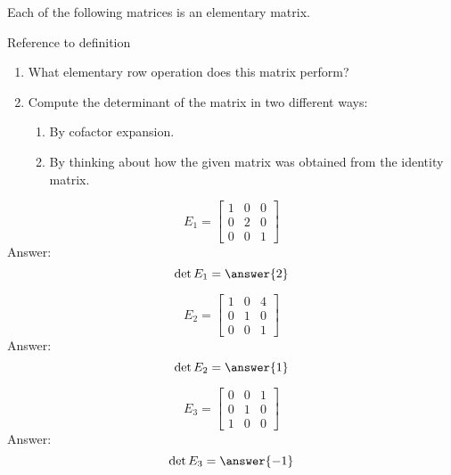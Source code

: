 \documentclass{ximera}
\begin{document}
\begin{problem}
Each of the following matrices is an elementary matrix. 
\begin{hint}
{\color{red}Reference to definition}
\end{hint}
  \begin{enumerate}
  \item What elementary row operation does this matrix perform?
  \item Compute the determinant of the matrix in two different ways:
    \begin{enumerate}
    \item By cofactor expansion.
    \item By thinking about how the given matrix was obtained from the identity matrix.
    \end{enumerate}
  \end{enumerate}
  
  \begin{problem}
  $$E_1=\begin{bmatrix}1&0&0\\0&2&0\\0&0&1\end{bmatrix}$$
   Answer: $$\det{E_1}=\answer{2}$$
  \end{problem}
  
  \begin{problem}
  $$E_2=\begin{bmatrix}1&0&4\\0&1&0\\0&0&1\end{bmatrix}$$
   Answer: $$\det{E_2}=\answer{1}$$
  \end{problem}
  
  \begin{problem}
  $$E_3=\begin{bmatrix}0&0&1\\0&1&0\\1&0&0\end{bmatrix}$$
   Answer: $$\det{E_3}=\answer{-1}$$
  \end{problem}
  
\end{problem}
\end{document}
